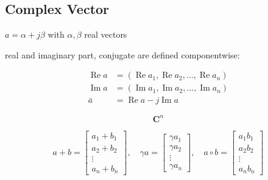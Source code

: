 \subsection{Complex Vector}

\begin{definition}
    $ a=\alpha+{j} \beta $ with $ \alpha, \beta $ real vectors
\end{definition}

\begin{definition}
    real and imaginary part, conjugate are defined componentwise:

\begin{equation}
\begin{aligned}
\operatorname{Re} a &=\left(\operatorname{Re} a_{1}, \operatorname{Re} a_{2}, \ldots, \operatorname{Re} a_{n}\right) \\
\operatorname{Im} a &=\left(\operatorname{Im} a_{1}, \operatorname{Im} a_{2}, \ldots, \operatorname{Im} a_{n}\right) \\
\bar{a} &=\operatorname{Re} a-{j} \operatorname{Im} a
\end{aligned}
\end{equation}
\end{definition}

\begin{definition}
    \begin{equation} \mathbf{C}^{n} \end{equation}
\end{definition}

\begin{definition}
    \begin{equation} a+b=\left[\begin{array}{c}a_{1}+b_{1} \\ a_{2}+b_{2} \\ \vdots \\ a_{n}+b_{n}\end{array}\right], \quad \gamma a=\left[\begin{array}{c}\gamma a_{1} \\ \gamma a_{2} \\ \vdots \\ \gamma a_{n}\end{array}\right], \quad a \circ b=\left[\begin{array}{c}a_{1} b_{1} \\ a_{2} b_{2} \\ \vdots \\ a_{n} b_{n}\end{array}\right] \end{equation}
\end{definition}

